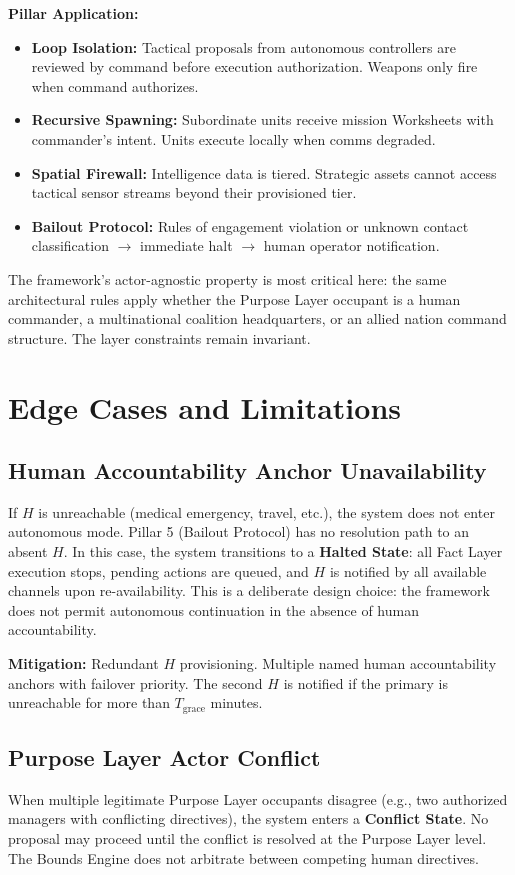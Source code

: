 \documentclass[12pt]{article}
\begin{document}
\textbf{Pillar Application:}
\begin{itemize}
\item \textbf{Loop Isolation:} Tactical proposals from autonomous controllers are reviewed by command before execution authorization. Weapons only fire when command authorizes.
\item \textbf{Recursive Spawning:} Subordinate units receive mission Worksheets with commander's intent. Units execute locally when comms degraded.
\item \textbf{Spatial Firewall:} Intelligence data is tiered. Strategic assets cannot access tactical sensor streams beyond their provisioned tier.
\item \textbf{Bailout Protocol:} Rules of engagement violation or unknown contact classification $\rightarrow$ immediate halt $\rightarrow$ human operator notification.
\end{itemize}

The framework's actor-agnostic property is most critical here: the same architectural rules apply whether the Purpose Layer occupant is a human commander, a multinational coalition headquarters, or an allied nation command structure. The layer constraints remain invariant.

\section{Edge Cases and Limitations}
\label{sec:limitations}

\subsection{Human Accountability Anchor Unavailability}
If $H$ is unreachable (medical emergency, travel, etc.), the system does not enter autonomous mode. Pillar 5 (Bailout Protocol) has no resolution path to an absent $H$. In this case, the system transitions to a \textbf{Halted State}: all Fact Layer execution stops, pending actions are queued, and $H$ is notified by all available channels upon re-availability. This is a deliberate design choice: the framework does not permit autonomous continuation in the absence of human accountability.

\textbf{Mitigation:} Redundant $H$ provisioning. Multiple named human accountability anchors with failover priority. The second $H$ is notified if the primary is unreachable for more than $T_{\text{grace}}$ minutes.

\subsection{Purpose Layer Actor Conflict}
When multiple legitimate Purpose Layer occupants disagree (e.g., two authorized managers with conflicting directives), the system enters a \textbf{Conflict State}. No proposal may proceed until the conflict is resolved at the Purpose Layer level. The Bounds Engine does not arbitrate between competing human directives.
\end{document}
